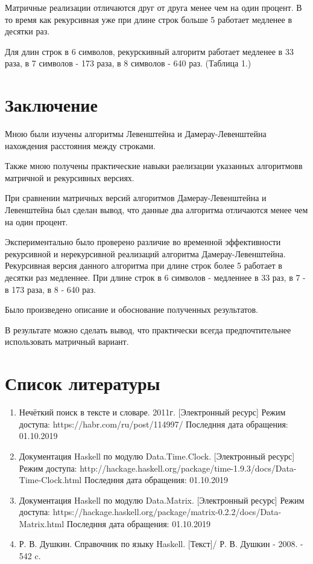 \documentclass[12pt]{report}
\begin{document}
\par
Матричные реализации отличаются друг от друга менее чем на один процент. В то время как рекурсивная уже при длине строк больше 5 работает медленее в десятки раз.

Для длин строк в 6 символов, рекурскивный алгоритм работает медленее в 33 раза, в 7 символов - 173 раза, в 8 символов - 640 раз. (Таблица 1.)

\chapter*{Заключение}

Мною были изучены алгоритмы Левенштейна и Дамерау-Левенштейна нахождения расстояния между строками.

Также мною получены практические навыки раелизации указанных алгоритмовв матричной  и рекурсивных версиях. 

При сравнении матричных версий алгоритмов Дамерау-Левенштейна и Левенштейна был сделан вывод, что данные два алгоритма отличаются менее чем на один процент.

Экспериментально было проверено различие во временной эффективности рекурсивной и нерекурсивной реализаций алгоритма Дамерау-Левенштейна.
Рекурсивная версия данного алгоритма при длине строк более 5 работает в десятки раз медленнее. При длине строк в 6 символов - медленнее в 33 раз, в 7 - в 173 раза, в 8 - 640 раз.

Было произведено описание и обоснование полученных результатов.

В результате можно сделать вывод, что практически всегда предпочтительнее использовать матричный вариант.

\chapter*{Список литературы}

\begin{enumerate}
	\item Нечёткий поиск в тексте и словаре. 2011г. [Электронный ресурс] Режим доступа: https://habr.com/ru/post/114997/ Последння дата обращения: 01.10.2019
	\item Документация Haskell по модулю Data.Time.Clock. [Электронный ресурс] Режим доступа: http://hackage.haskell.org/package/time-1.9.3/docs/Data-Time-Clock.html Последння дата обращения: 01.10.2019
	\item Документация Haskell по модулю Data.Matrix. [Электронный ресурс] Режим доступа: https://hackage.haskell.org/package/matrix-0.2.2/docs/Data-Matrix.html Последння дата обращения: 01.10.2019
	\item Р. В. Душкин. Справочник по языку Haskell. [Текст]/ Р. В. Душкин -  2008. - 542 c.
\end{enumerate}
\end{document}
